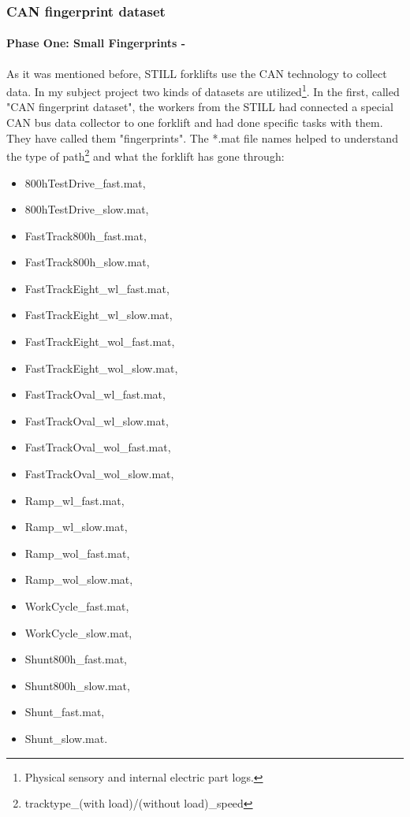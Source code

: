 			\subsubsection{CAN fingerprint dataset}
				\paragraph{Phase One: Small Fingerprints - }
				\noindent
As it was mentioned before, STILL forklifts \cite{RX20} use the CAN technology \cite{CAN} to collect data. In my subject project two kinds of datasets are utilized\footnote{Physical sensory and internal electric part logs.}. In the first, called "CAN fingerprint dataset", the workers from the STILL had connected a special CAN bus data collector to one forklift and had done specific tasks with them. They have called them "fingerprints". The *.mat file names helped to understand the type of path\footnote{tracktype\_(with load)/(without load)\_speed} and what the forklift has gone through:

\begin{itemize}[noitemsep]
    \item {800hTestDrive\_fast.mat,}
    \item {800hTestDrive\_slow.mat,}
    \item {FastTrack800h\_fast.mat,}
 	\item {FastTrack800h\_slow.mat,}
	\item {FastTrackEight\_wl\_fast.mat,}
	\item {FastTrackEight\_wl\_slow.mat,}
	\item {FastTrackEight\_wol\_fast.mat,}
	\item {FastTrackEight\_wol\_slow.mat,}
  	\item {FastTrackOval\_wl\_fast.mat,}
	\item {FastTrackOval\_wl\_slow.mat,}
	\item {FastTrackOval\_wol\_fast.mat,}
	\item {FastTrackOval\_wol\_slow.mat,}
	\item {Ramp\_wl\_fast.mat,} 
	\item {Ramp\_wl\_slow.mat,}
	\item {Ramp\_wol\_fast.mat,}
	\item {Ramp\_wol\_slow.mat,}
    \item {WorkCycle\_fast.mat,}
    \item {WorkCycle\_slow.mat,}
	\item {Shunt800h\_fast.mat,}  	
  	\item {Shunt800h\_slow.mat,}
 	\item {Shunt\_fast.mat,} 	
 	\item {Shunt\_slow.mat.}
\end{itemize}

